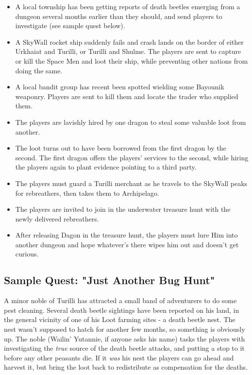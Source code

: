 \documentclass[12pt,a4paper,twocolumn]{article}
\begin{document}
\begin{itemize}

\item A local township has been getting reports of death beetles emerging from a dungeon several months earlier than they should, and send players to investigate (see sample quest below).

\item A SkyWall rocket ship suddenly fails and crash lands on the border of either Urkhaiat and Turilli, or Turilli and Shulme.  The players are sent to capture or kill the Space Men and loot their ship, while preventing other nations from doing the same.

\item A local bandit group has recent been spotted wielding some Bayounik weaponry.  Players are sent to kill them and locate the trader who supplied them.

\item The players are lavishly hired by one dragon to steal some valuable loot from another.

\item The loot turns out to have been borrowed from the first dragon by the second.  The first dragon offers the players' services to the second, while hiring the players again to plant evidence pointing to a third party.

\item The players must guard a Turilli merchant as he travels to the SkyWall peaks for rebreathers, then takes them to Archipelago.

\item The players are invited to join in the underwater treasure hunt with the newly delivered rebreathers.

\item After releasing Dagon in the treasure hunt, the players must lure Him into another dungeon and hope whatever's there wipes him out and doesn't get curious.

\end{itemize}

\subsection{Sample Quest: "Just Another Bug Hunt"}

A minor noble of Turilli has attracted a small band of adventurers to do some pest cleaning.  Several death beetle sightings have been reported on his land, in the general vicinity of one of his Loot farming sites - a death beetle nest.  The nest wasn't supposed to hatch for another few months, so something is obviously up.  The noble (Wailin' Yutannie, if anyone asks his name) tasks the players with investigating the {\it true} source of the death beetle attacks, and putting a stop to it before any other peasants die.  If it {\it was} his nest the players can go ahead and harvest it, but bring the loot back to redistribute as compensation for the deaths.
\end{document}
